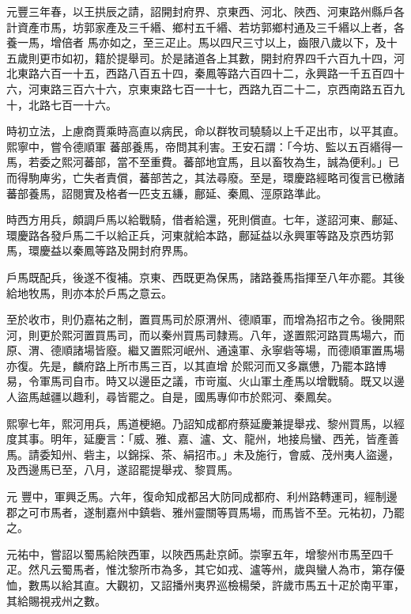 \begin{pinyinscope}
 元豐三年春，以王拱辰之請，詔開封府界、京東西、河北、陜西、河東路州縣戶各計資產市馬，坊郭家產及三千緡、鄉村五千緡、若坊郭鄉村通及三千緡以上者，各養一馬，增倍者
 馬亦如之，至三疋止。馬以四尺三寸以上，齒限八歲以下，及十五歲則更市如初，籍於提舉司。於是諸道各上其數，開封府界四千六百九十四，河北東路六百一十五，西路八百五十四，秦鳳等路六百四十二，永興路一千五百四十六，河東路三百六十六，京東東路七百一十七，西路九百二十二，京西南路五百九十，北路七百一十六。



 時初立法，上慮商賈乘時高直以病民，命以群牧司驍騎以上千疋出市，以平其直。熙寧中，嘗令德順軍
 蕃部養馬，帝問其利害。王安石謂：「今坊、監以五百緡得一馬，若委之熙河蕃部，當不至重費。蕃部地宜馬，且以畜牧為生，誠為便利。」已而得駒庳劣，亡失者責償，蕃部苦之，其法尋廢。至是，環慶路經略司復言已檄諸蕃部養馬，詔閱實及格者一匹支五縑，鄜延、秦鳳、涇原路準此。



 時西方用兵，頗調戶馬以給戰騎，借者給還，死則償直。七年，遂詔河東、鄜延、環慶路各發戶馬二千以給正兵，河東就給本路，鄜延益以永興軍等路及京西坊郭
 馬，環慶益以秦鳳等路及開封府界馬。



 戶馬既配兵，後遂不復補。京東、西既更為保馬，諸路養馬指揮至八年亦罷。其後給地牧馬，則亦本於戶馬之意云。



 至於收市，則仍嘉祐之制，置買馬司於原渭州、德順軍，而增為招市之令。後開熙河，則更於熙河置買馬司，而以秦州買馬司隸焉。八年，遂置熙河路買馬場六，而原、渭、德順諸場皆廢。繼又置熙河岷州、通遠軍、永寧砦等場，而德順軍置馬場亦復。先是，麟府路上所市馬三百，以其直增
 於熙河而又多羸憊，乃罷本路博易，令軍馬司自市。時又以邊臣之議，市岢嵐、火山軍土產馬以增戰騎。既又以邊人盜馬越疆以趣利，尋皆罷之。自是，國馬專仰市於熙河、秦鳳矣。



 熙寧七年，熙河用兵，馬道梗絕。乃詔知成都府蔡延慶兼提舉戎、黎州買馬，以經度其事。明年，延慶言：「威、雅、嘉、瀘、文、龍州，地接烏蠻、西羌，皆產善馬。請委知州、砦主，以錦採、茶、絹招市。」未及施行，會威、茂州夷人盜邊，及西邊馬已至，八月，遂詔罷提舉戎、黎買馬。



 元
 豐中，軍興乏馬。六年，復命知成都呂大防同成都府、利州路轉運司，經制邊郡之可市馬者，遂制嘉州中鎮砦、雅州靈關等買馬場，而馬皆不至。元祐初，乃罷之。



 元祐中，嘗詔以蜀馬給陜西軍，以陜西馬赴京師。崇寧五年，增黎州市馬至四千疋。然凡云蜀馬者，惟沈黎所市為多，其它如戎、瀘等州，歲與蠻人為市，第存優恤，數馬以給其直。大觀初，又詔播州夷界巡檢楊榮，許歲市馬五十疋於南平軍，其給賜視戎州之數。




\end{pinyinscope}
